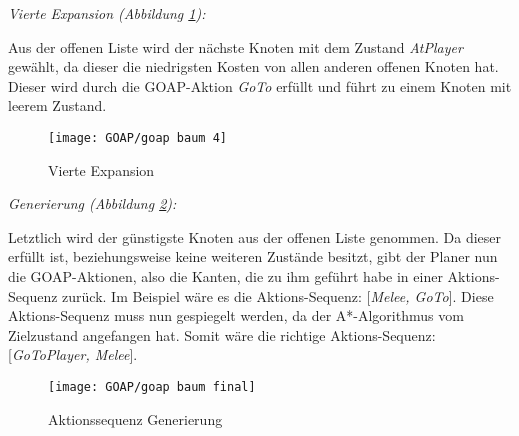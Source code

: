\clearpage

\textit{Vierte Expansion (Abbildung \ref{fig:goap4}):}

Aus der offenen Liste wird der n\"{a}chste Knoten mit dem Zustand \textit{AtPlayer} gew\"{a}hlt, da dieser die niedrigsten Kosten von allen anderen offenen Knoten hat. Dieser wird durch die GOAP-Aktion \textit{GoTo} erf\"{u}llt und f\"{u}hrt zu einem Knoten mit leerem Zustand.

\begin{figure}[h]
  \centering
  \texttt{[image: GOAP/goap baum 4]}
	\captionsetup{justification=justified, format=plain}
  \caption{Vierte Expansion}
  \label{fig:goap4}
\end{figure}

\clearpage

\textit{Generierung (Abbildung \ref{fig:goap5}):}

Letztlich wird der g\"{u}nstigste Knoten aus der offenen Liste genommen. Da dieser erf\"{u}llt ist, beziehungsweise keine weiteren Zust\"{a}nde besitzt, gibt der Planer nun die GOAP-Aktionen, also die Kanten, die zu ihm gef\"{u}hrt habe in einer Aktions-Sequenz zur\"{u}ck. Im Beispiel w\"{a}re es die Aktions-Sequenz: [\textit{Melee, GoTo}]. Diese Aktions-Sequenz muss nun gespiegelt werden, da der A*-Algorithmus vom Zielzustand angefangen hat. Somit w\"{a}re die richtige Aktions-Sequenz: [\textit{GoToPlayer, Melee}].

\begin{figure}[h]
  \centering
  \texttt{[image: GOAP/goap baum final]}
	\captionsetup{justification=justified, format=plain}
  \caption{Aktionssequenz Generierung}
  \label{fig:goap5}
\end{figure}
